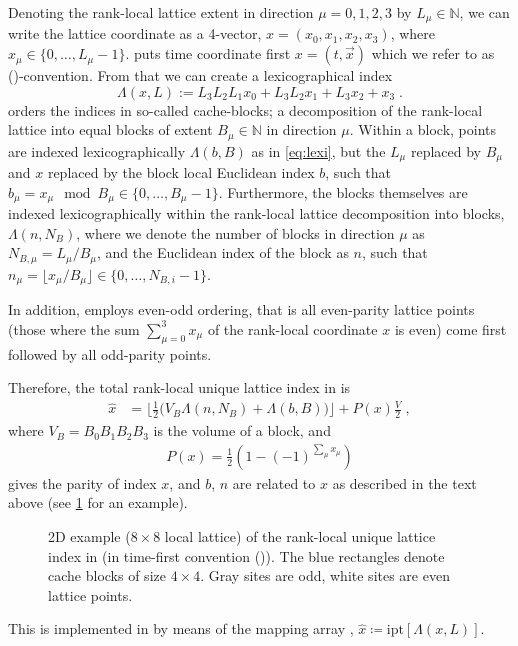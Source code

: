 Denoting the rank-local lattice extent in direction $\mu=0,1,2,3$ by $L_\mu \in \mathbb{N}$, we can write the lattice coordinate as a 4-vector, $x = (x_0,x_1,x_2,x_3)$, where $x_\mu \in \{ 0, \dots, L_\mu -1 \}$. \Openqxd puts time coordinate first $x = (t, \vec{x})$ which we refer to as (\txyz)-convention. From that we can create a lexicographical index
\begin{equation} \label{eq:lexi}
\Lambda(x, L) := L_3 L_2 L_1 x_0 + L_3 L_2 x_1 + L_3 x_2 + x_3 \;.
\end{equation}
\Openqxd orders the indices in so-called cache-blocks; a decomposition of the rank-local lattice into equal blocks of extent $B_\mu \in \mathbb{N}$ in direction $\mu$. Within a block, points are indexed lexicographically $\Lambda(b, B)$ as in \cref{eq:lexi}, but the $L_\mu$ replaced by $B_\mu$ and $x$ replaced by the block local Euclidean index $b$, such that $b_\mu = x_\mu \mod B_\mu \in \{ 0, \dots, B_\mu -1 \}$.
Furthermore, the blocks themselves are indexed lexicographically within the rank-local lattice decomposition into blocks, \ie $\Lambda(n, N_B)$, where we denote the number of blocks in direction $\mu$ as $N_{B,\mu} = L_\mu / B_\mu$, and the Euclidean index of the block as $n$, such that $n_\mu = \lfloor x_\mu / B_\mu \rfloor \in \{ 0, \dots, N_{B,i} -1 \}$.

In addition, \openqxd employs even-odd ordering, that is all even-parity lattice points (those where the sum $\sum_{\mu=0}^3 x_\mu$ of the rank-local coordinate $x$ is even) come first followed by all odd-parity points.

Therefore, the total rank-local unique lattice index in \openqxd is
\begin{align} \label{eq:openqcd:ipt}
\hat{x} &= \biggl \lfloor \frac{1}{2} \Big( V_B \Lambda(n, N_B) + \Lambda(b, B) \Big) \biggr \rfloor + P(x) \frac{V}{2} \;,
\end{align}
where $V_B = B_0 B_1 B_2 B_3$ is the volume of a block, and
\begin{align} \label{eq:parity}
P(x)=\tfrac{1}{2}(1-(-1)^{\sum_\mu x_\mu})
\end{align}
gives the parity of index $x$, and $b$, $n$ are related to $x$ as described in the text above (see \cref{fig:index} for an example).
\begin{figure}
  \caption{2D example ($8 \times 8$ local lattice) of the rank-local unique lattice index in \openqxd (in time-first convention (\txyz)). The blue rectangles denote cache blocks of size $4 \times 4$. Gray sites are odd, white sites are even lattice points.}
  \label{fig:index}
\end{figure}
This is implemented in \openqxd by means of the mapping array , $\hat{x} \coloneqq \text{ipt}\left[\Lambda(x,L)\right]$.

